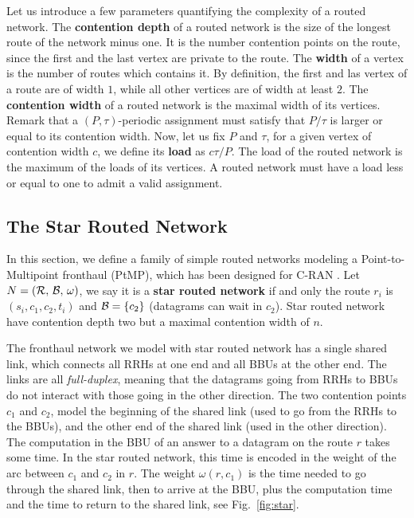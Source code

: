 \documentclass[a4paper,10pt]{article}
\begin{document}
  	Let us introduce a few parameters quantifying the complexity of a routed network.
	The \textbf{contention depth} of a routed network is the size of the longest route of the network minus one. It is the number contention points on the route, since the first and the last vertex are private to the route. The \textbf{width} of a vertex is the number of routes which contains it. By definition, 
	the first and las vertex of a route are of width $1$, while all other vertices are of width at least $2$.
	The \textbf{contention width} of a routed network is the maximal width of its vertices. 
	Remark that a $(P,\tau)$-periodic assignment must satisfy that $P/\tau$ is larger or equal to its contention width. Now, let us fix $P$ and $\tau$, for a given vertex of contention width $c$, we define its \textbf{load} as $c\tau/P$. The load of the routed network is the maximum of the loads of its vertices. A routed network must have a load less or equal to one to admit a valid assignment.



    \subsection{The Star Routed Network} \label{sec:star_routed_network}
  
	In this section, we define a family of simple routed networks modeling a Point-to-Multipoint fronthaul (PtMP), which has been designed for C-RAN \cite{tayq2017real}. Let $N = (\cal{R},\,\cal{B},\,\omega)$, we say it is a \textbf{star routed network} if and only the route $r_i$ is $(s_i,c_1,c_2,t_i)$ and ${\cal B} = \{ c_2 \}$ (datagrams can wait in $c_2$). Star routed network have contention depth two but a maximal contention width of $n$.

	The fronthaul network we model with star routed network has a single shared link, which connects all RRHs at one end and all BBUs at the other end. The links are all \emph{full-duplex}, meaning that the datagrams going from RRHs to BBUs do not interact with those going in the other direction. 
	The two contention points $c_1$ and $c_2$, model the beginning of the shared link (used to go from the RRHs to the BBUs), and the other end of the shared link (used in the other direction). 
	The computation in the BBU of an answer to a datagram on the route $r$ takes some time.
	In the star routed network, this time is encoded in the weight of the arc between $c_1$ and $c_2$ in $r$. The weight $\omega(r,c_1)$ is the time needed to go through the shared link, then to arrive at the BBU, plus the computation time and the time to return to the shared link, see Fig.~\ref{fig:star}.
\end{document}
